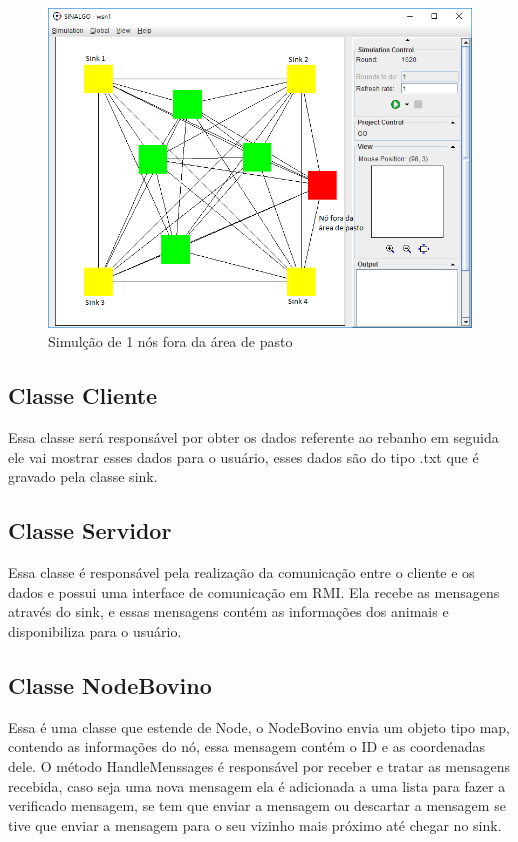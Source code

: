 \documentclass[12pt]{article}
\begin{document}
\begin{figure}[ht]
	\centering
	\includegraphics[scale=0.6]{foradopasto.png}
	\caption{Simulção de 1 nós fora da área de pasto}
	\label{foradopasto}
\end{figure}
\FloatBarrier 

\subsection{Classe Cliente}
Essa classe será responsável por obter os dados referente ao rebanho em seguida ele vai mostrar esses dados para o usuário, esses dados são do tipo .txt que é gravado pela classe sink.

\subsection{Classe Servidor}
Essa classe é responsável pela realização da comunicação entre o cliente e os dados e possui uma interface de comunicação em RMI. Ela recebe as mensagens através do sink, e essas mensagens contém as informações dos animais e disponibiliza para o usuário.

\subsection{Classe NodeBovino}
Essa é uma classe que estende de Node, o NodeBovino envia um objeto tipo map, contendo as informações do nó, essa mensagem contém o ID e as coordenadas dele. O método HandleMenssages é responsável por receber e tratar as mensagens recebida, caso seja uma nova mensagem ela é adicionada a uma lista para fazer a verificado mensagem, se tem que enviar a mensagem ou descartar a mensagem se tive que enviar a mensagem para o seu vizinho mais próximo até chegar no sink.
\end{document}
